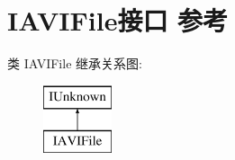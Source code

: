 \hypertarget{interface_i_a_v_i_file}{}\section{I\+A\+V\+I\+File接口 参考}
\label{interface_i_a_v_i_file}
类 I\+A\+V\+I\+File 继承关系图\+:\begin{figure}[H]
\begin{center}
\leavevmode
\includegraphics[height=2.000000cm]{interface_i_a_v_i_file}
\end{center}
\end{figure}
